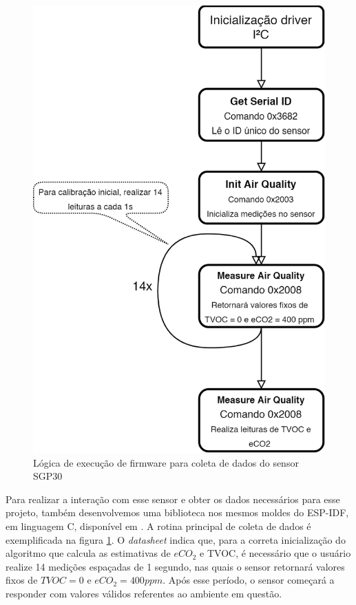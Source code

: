 \documentclass[../monografia.tex]{subfiles}
\begin{document}
\begin{figure}[h]
	\centering
	\includegraphics[scale=0.2]{sgp30_firmware.png}
	\caption{Lógica de execução de firmware para coleta de dados do sensor SGP30}
	\label{fig:sgp30_firmware}
\end{figure}

Para realizar a interação com esse sensor e obter os dados necessários para esse projeto, também desenvolvemos uma biblioteca nos mesmos moldes do ESP-IDF, em linguagem C, disponível em \cite{sgp30-lib}. A rotina principal de coleta de dados é exemplificada na figura \ref{fig:sgp30_firmware}. O \textit{datasheet} indica que, para a correta inicialização do algoritmo que calcula as estimativas de $eCO_{2}$ e TVOC, é necessário que o usuário realize 14 medições espaçadas de 1 segundo, nas quais o sensor retornará valores fixos de $TVOC = 0$ e $eCO_{2} = 400 ppm$. Após esse período, o sensor começará a responder com valores válidos referentes ao ambiente em questão.
\end{document}
